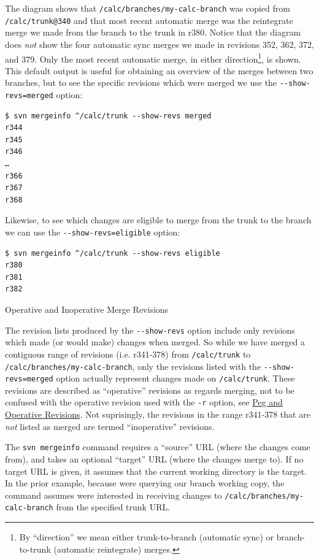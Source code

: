 The diagram shows that \texttt{/calc/branches/my-calc-branch} was copied
from \texttt{/calc/trunk@340} and that most recent automatic merge was
the reintegrate merge we made from the branch to the trunk in r380.
Notice that the diagram does \emph{not} show the four automatic sync
merges we made in revisions 352, 362, 372, and 379. Only the most recent
automatic merge, in either direction\footnote{By ``direction'' we mean
  either trunk-to-branch (automatic sync) or branch-to-trunk (automatic
  reintegrate) merges.}, is shown. This default output is useful for
obtaining an overview of the merges between two branches, but to see the
specific revisions which were merged we use the
\texttt{-\/-show-revs=merged} option:

\begin{verbatim}
$ svn mergeinfo ^/calc/trunk --show-revs merged
r344
r345
r346
…
r366
r367
r368
\end{verbatim}

Likewise, to see which changes are eligible to merge from the trunk to
the branch we can use the \texttt{-\/-show-revs=eligible} option:

\begin{verbatim}
$ svn mergeinfo ^/calc/trunk --show-revs eligible
r380
r381
r382
\end{verbatim}

\protect{}\label{svn.branchmerge.basicmerging.mergeinfo.operativerevs}
Operative and Inoperative Merge Revisions

The revision lists produced by the \texttt{-\/-show-revs} option include
only revisions which made (or would make) changes when merged. So while
we have merged a contiguous range of revisions (i.e. r341-378) from
\texttt{/calc/trunk} to \texttt{/calc/branches/my-calc-branch}, only the
revisions listed with the \texttt{-\/-show-revs=merged} option actually
represent changes made on \texttt{/calc/trunk}. These revisions are
described as ``operative'' revisions as regards merging, not to be
confused with the operative revision used with the \texttt{-r} option,
see \hyperref[svn.advanced.pegrevs]{Peg and Operative Revisions}. Not
suprisingly, the revisions in the range r341-378 that are \emph{not}
listed as merged are termed ``inoperative'' revisions.

The \texttt{svn\ mergeinfo} command requires a ``source'' URL (where the
changes come from), and takes an optional ``target'' URL (where the
changes merge to). If no target URL is given, it assumes that the
current working directory is the target. In the prior example, because
we\textquotesingle re querying our branch working copy, the command
assumes we\textquotesingle re interested in receiving changes to
\texttt{/calc/branches/my-calc-branch} from the specified trunk URL.

